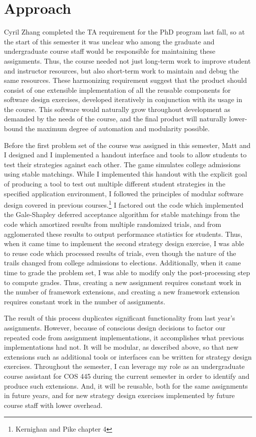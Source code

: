 \documentclass[pageno]{jpaper}
\begin{document}
\section*{Approach}
Cyril Zhang completed the TA requirement for the PhD program last fall, so at the start of this semester it was unclear who among the graduate and undergraduate course staff would be responsible for maintaining these assignments.
Thus, the course needed not just long-term work to improve student and instructor resources, but also short-term work to maintain and debug the same resources.
These harmonizing requirement suggest that the product should consist of one extensible implementation of all the reusable components for software design exercises, developed iteratively in conjunction with its usage in the course.
This software would naturally grow throughout development as demanded by the needs of the course, and the final product will naturally lower-bound the maximum degree of automation and modularity possible.

Before the first problem set of the course was assigned in this semester, Matt and I designed and I implemented a handout interface and tools to allow students to test their strategies against each other.
The game simulates college admissions using stable matchings.
While I implemented this handout with the explicit goal of producing a tool to test out multiple different student strategies in the specified application environment, I followed the principles of modular software design covered in previous courses.\footnote{Kernighan and Pike chapter 4}
I factored out the code which implemented the Gale-Shapley deferred acceptance algorithm for stable matchings from the code which amortized results from multiple randomized trials, and from agglomerated these results to output performance statistics for students.
Thus, when it came time to implement the second strategy design exercise, I was able to reuse code which processed results of trials, even though the nature of the trails changed from college admissions to elections.
Additionally, when it came time to grade the problem set, I was able to modify only the post-processing step to compute grades.
Thus, creating a new assignment requires constant work in the number of framework extensions, and creating a new framework extension requires constant work in the number of assignments.

The result of this process duplicates significant functionality from last year's assignments.
However, because of conscious design decisions to factor our repeated code from assignment implementations, it accomplishes what previous implementations had not.
It will be modular, as described above, so that new extensions such as additional tools or interfaces can be written for strategy design exercises.
Throughout the semester, I can leverage my role as an undergraduate course assistant for COS 445 during the current semester in order to identify and produce such extensions.
And, it will be reusable, both for the same assignments in future years, and for new strategy design exercises implemented by future course staff with lower overhead.
\end{document}

